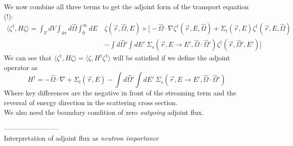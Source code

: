 \documentclass[12pt]{article}
\newcommand{\rvec}{\ensuremath{\vec{r}}}
\newcommand{\vOmega}{\ensuremath{\hat{\Omega}}}
\begin{document}
\begin{itemize}
\end{itemize}
%
We now combine all three terms to get the adjoint form of the transport equation (!):
\begin{align*}
\langle\zeta^{\dagger}, H \zeta\rangle = \int_{V} dV \int_{4\pi} d\vOmega \int_0^{\infty} dE \: &\zeta (\rvec, \vOmega, E) \times \biggl[-\vOmega \cdot \nabla \zeta^{\dagger}(\vec{r}, E, \vOmega)  + \Sigma_t(\rvec,E) \zeta^{\dagger}(\vec{r}, E, \vOmega) \\&- \int d\vOmega' \int dE'\: \Sigma_s(\rvec, E \rightarrow E', \vOmega \cdot \vOmega') \zeta^{\dagger}(\rvec, \vOmega', E') \biggr]
\end{align*}
%
We can see that $\langle\zeta^{\dagger}, H \zeta\rangle = \langle\zeta, H^{\dagger} \zeta^{\dagger}\rangle$ will be satisfied if we define the adjoint operator as
\[
H^{\dagger} = -\vOmega \cdot \nabla  + \Sigma_t(\rvec,E) - \int d\vOmega' \int dE'\: \Sigma_s(\rvec, E \rightarrow E', \vOmega \cdot \vOmega')
\]
Where key differences are the negative in front of the streaming term and the reversal of energy direction in the scattering cross section.\\
We also need the boundary condition of zero \textit{outgoing} adjoint flux.

------------------------\\
Interpretation of adjoint flux as \textit{neutron importance}
\end{document}
